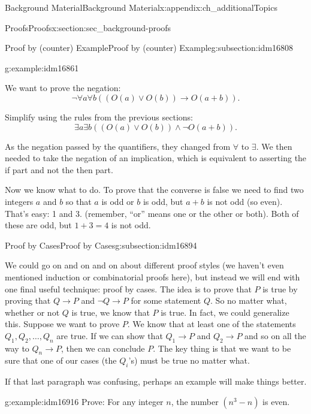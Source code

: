 \documentclass[oneside,10pt,]{book}
\numberwithin{equation}{chapter}
\def\imp{\rightarrow}
\begin{document}
\begin{appendixptx}{Background Material}{}{Background Material}{}{}{x:appendix:ch_additionalTopics}
\begin{sectionptx}{Proofs}{}{Proofs}{}{}{x:section:sec_background-proofs}
\begin{subsectionptx}{Proof by (counter) Example}{}{Proof by (counter) Example}{}{}{g:subsection:idm16808}
\begin{example}{}{g:example:idm16861}
%
\par
We want to prove the negation:%
\begin{equation*}
\neg \forall a \forall b ((O(a) \vee O(b)) \imp O(a+b)).
\end{equation*}
%
\par
Simplify using the rules from the previous sections:%
\begin{equation*}
\exists a \exists b ((O(a) \vee O(b)) \wedge \neg O(a+b)).
\end{equation*}
%
\par
As the negation passed by the quantifiers, they changed from \(\forall\) to \(\exists\). We then needed to take the negation of an implication, which is equivalent to asserting the if part and not the then part.%
\par
Now we know what to do. To prove that the converse is false we need to find two integers \(a\) and \(b\) so that \(a\) is odd or \(b\) is odd, but \(a+b\) is not odd (so even). That's easy: 1 and 3. (remember, ``or'' means one or the other or both). Both of these are odd, but \(1+3 = 4\) is not odd.%
\end{example}
\end{subsectionptx}
%
%
\typeout{************************************************}
\typeout{************************************************}
%
\begin{subsectionptx}{Proof by Cases}{}{Proof by Cases}{}{}{g:subsection:idm16894}
%
\par
We could go on and on and on about different proof styles (we haven't even mentioned induction or combinatorial proofs here), but instead we will end with one final useful technique: proof by cases. The idea is to prove that \(P\) is true by proving that \(Q \imp P\) and \(\neg Q \imp P\) for some statement \(Q\). So no matter what, whether or not \(Q\) is true, we know that \(P\) is true. In fact, we could generalize this. Suppose we want to prove \(P\). We know that at least one of the statements \(Q_1, Q_2, \ldots, Q_n\) are true. If we can show that \(Q_1 \imp P\) and \(Q_2 \imp P\) and so on all the way to \(Q_n \imp P\), then we can conclude \(P\). The key thing is that we want to be sure that one of our cases (the \(Q_i\)'s) must be true no matter what.%
\par
If that last paragraph was confusing, perhaps an example will make things better.%
\begin{example}{}{g:example:idm16916}%
Prove: For any integer \(n\), the number \((n^3 -n)\) is even.%

\end{example}
\end{subsectionptx}
\end{sectionptx}
\end{appendixptx}
\end{document}
